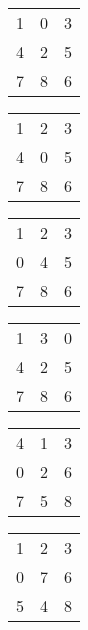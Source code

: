 \documentclass{article}
\begin{document}
\begin{table}[!htb]
    \begin{subtable}{.1\linewidth}
      \centering
        \begin{tabular}{ccc |}
1 & 0 & 3 \\
4 & 2 & 5 \\
7 & 8 & 6 \\
        \end{tabular}
    \end{subtable}%
    \begin{subtable}{.1\linewidth}
      \centering
        \begin{tabular}{ccc |}
1 & 2 & 3 \\
4 & 0 & 5 \\
7 & 8 & 6 \\
        \end{tabular}
    \end{subtable} 
     \begin{subtable}{.1\linewidth}
      \centering
        \begin{tabular}{ccc |}
1 & 2 & 3 \\
0 & 4 & 5 \\
7 & 8 & 6 \\
        \end{tabular}
    \end{subtable} 
    \begin{subtable}{.1\linewidth}
      \centering
        \begin{tabular}{ccc |}
1 & 3 & 0 \\
4 & 2 & 5 \\
7 & 8 & 6 \\
        \end{tabular}
    \end{subtable} 
    \begin{subtable}{.1\linewidth}
      \centering
        \begin{tabular}{ccc |}
4 & 1 & 3 \\
0 & 2 & 6 \\
7 & 5 & 8 \\
        \end{tabular}
    \end{subtable} 
    \begin{subtable}{.1\linewidth}
      \centering
        \begin{tabular}{ccc |}
1 & 2 & 3 \\
0 & 7 & 6 \\
5 & 4 & 8 \\

\end{tabular}
\end{subtable}
\end{table}
\end{document}
